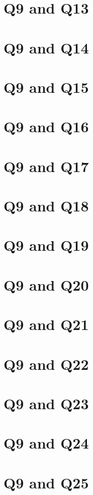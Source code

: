 \documentclass{report}
\begin{document}
\section{Q9 and Q13}\clearpage
\section{Q9 and Q14}\clearpage
\section{Q9 and Q15}\clearpage
\section{Q9 and Q16}\clearpage
\section{Q9 and Q17}\clearpage
\section{Q9 and Q18}\clearpage
\section{Q9 and Q19}\clearpage
\section{Q9 and Q20}\clearpage
\section{Q9 and Q21}\clearpage
\section{Q9 and Q22}\clearpage
\section{Q9 and Q23}\clearpage
\section{Q9 and Q24}\clearpage
\section{Q9 and Q25}\clearpage
\end{document}

